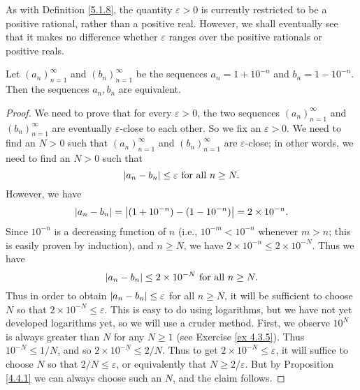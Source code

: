 \begin{remark}\label{5.2.7}
    As with Definition \ref{5.1.8}, the quantity \(\varepsilon > 0\) is currently restricted to be a positive rational, rather than a positive real.
    However, we shall eventually see that it makes no difference whether \(\varepsilon\) ranges over the positive rationals or positive reals.
\end{remark}

\begin{proposition}\label{5.2.8}
    Let \((a_n)_{n = 1}^{\infty}\) and \((b_n)_{n = 1}^{\infty}\) be the sequences \(a_n = 1 + 10^{-n}\) and \(b_n = 1 - 10^{-n}\).
    Then the sequences \(a_n, b_n\) are equivalent.
\end{proposition}

\begin{proof}
    We need to prove that for every \(\varepsilon > 0\), the two sequences \((a_n)_{n = 1}^{\infty}\) and \((b_n)_{n = 1}^{\infty}\) are eventually \(\varepsilon\)-close to each other.
    So we fix an \(\varepsilon > 0\).
    We need to find an \(N > 0\) such that \((a_n)_{n = 1}^{\infty}\) and \((b_n)_{n = 1}^{\infty}\) are \(\varepsilon\)-close;
    in other words, we need to find an \(N > 0\) such that
    \[
        \abs*{a_n - b_n} \leq \varepsilon \text{ for all } n \geq N.
    \]
    However, we have
    \[
        \abs*{a_n - b_n} = \abs*{(1 + 10^{-n}) - (1 - 10^{-n})} = 2 \times 10^{-n}.
    \]
    Since \(10^{-n}\) is a decreasing function of \(n\) (i.e., \(10^{-m} < 10^{-n}\) whenever \(m > n\);
    this is easily proven by induction), and \(n \geq N\), we have \(2 \times 10^{-n} \leq 2 \times 10^{-N}\).
    Thus we have
    \[
        \abs*{a_n - b_n} \leq 2 \times 10^{-N} \text{ for all } n \geq N.
    \]
    Thus in order to obtain \(\abs*{a_n - b_n} \leq \varepsilon\) for all \(n \geq N\), it will be sufficient to choose \(N\) so that \(2 \times 10^{-N} \leq \varepsilon\).
    This is easy to do using logarithms, but we have not yet developed logarithms yet, so we will use a cruder method.
    First, we observe \(10^N\) is always greater than \(N\) for any \(N \geq 1\) (see Exercise \ref{ex 4.3.5}).
    Thus \(10^{-N} \leq 1 / N\), and so \(2 \times 10^{-N} \leq 2 / N\).
    Thus to get \(2 \times 10^{-N} \leq \varepsilon\), it will suffice to choose \(N\) so that \(2 / N \leq \varepsilon\), or equivalently that \(N \geq 2 / \varepsilon\).
    But by Proposition \ref{4.4.1} we can always choose such an \(N\), and the claim follows.
\end{proof}

